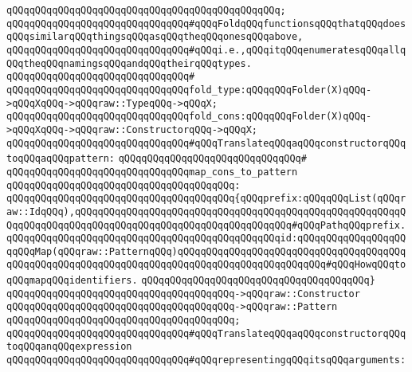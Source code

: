 \verb|qQQqqQQqqQQqqQQqqQQqqQQqqQQqqQQqqQQqqQQqqQQqqQQq;|\newline
\newline
\verb|qQQqqQQqqQQqqQQqqQQqqQQqqQQqqQQq#qQQqFoldqQQqfunctionsqQQqthatqQQqdoesqQQqsimilarqQQqthingsqQQqasqQQqtheqQQqonesqQQqabove,|\newline
\verb|qQQqqQQqqQQqqQQqqQQqqQQqqQQqqQQq#qQQqi.e.,qQQqitqQQqenumeratesqQQqallqQQqtheqQQqnamingsqQQqandqQQqtheirqQQqtypes.|\newline
\verb|qQQqqQQqqQQqqQQqqQQqqQQqqQQqqQQq#|\newline
\verb|qQQqqQQqqQQqqQQqqQQqqQQqqQQqqQQqfold_type:qQQqqQQqFolder(X)qQQq->qQQqXqQQq->qQQqraw::TypeqQQq->qQQqX;|\newline
\verb|qQQqqQQqqQQqqQQqqQQqqQQqqQQqqQQqfold_cons:qQQqqQQqFolder(X)qQQq->qQQqXqQQq->qQQqraw::ConstructorqQQq->qQQqX;|\newline
\newline
\verb|qQQqqQQqqQQqqQQqqQQqqQQqqQQqqQQq#qQQqTranslateqQQqaqQQqconstructorqQQqtoqQQqaqQQqpattern:|\newline
\verb|qQQqqQQqqQQqqQQqqQQqqQQqqQQqqQQq#|\newline
\verb|qQQqqQQqqQQqqQQqqQQqqQQqqQQqqQQqmap_cons_to_pattern|\newline
\verb|qQQqqQQqqQQqqQQqqQQqqQQqqQQqqQQqqQQqqQQq:|\newline
\verb|qQQqqQQqqQQqqQQqqQQqqQQqqQQqqQQqqQQqqQQq{qQQqprefix:qQQqqQQqList(qQQqraw::IdqQQq),qQQqqQQqqQQqqQQqqQQqqQQqqQQqqQQqqQQqqQQqqQQqqQQqqQQqqQQqqQQqqQQqqQQqqQQqqQQqqQQqqQQqqQQqqQQqqQQqqQQqqQQqqQQq#qQQqPathqQQqprefix.|\newline
\verb|qQQqqQQqqQQqqQQqqQQqqQQqqQQqqQQqqQQqqQQqqQQqqQQqid:qQQqqQQqqQQqqQQqqQQqqQQqMap(qQQqraw::PatternqQQq)qQQqqQQqqQQqqQQqqQQqqQQqqQQqqQQqqQQqqQQqqQQqqQQqqQQqqQQqqQQqqQQqqQQqqQQqqQQqqQQqqQQqqQQqqQQqqQQq#qQQqHowqQQqtoqQQqmapqQQqidentifiers.|\newline
\verb|qQQqqQQqqQQqqQQqqQQqqQQqqQQqqQQqqQQqqQQq}|\newline
\verb|qQQqqQQqqQQqqQQqqQQqqQQqqQQqqQQqqQQqqQQq->qQQqraw::Constructor|\newline
\verb|qQQqqQQqqQQqqQQqqQQqqQQqqQQqqQQqqQQqqQQq->qQQqraw::Pattern|\newline
\verb|qQQqqQQqqQQqqQQqqQQqqQQqqQQqqQQqqQQqqQQq;|\newline
\newline
\verb|qQQqqQQqqQQqqQQqqQQqqQQqqQQqqQQq#qQQqTranslateqQQqaqQQqconstructorqQQqtoqQQqanqQQqexpression|\newline
\verb|qQQqqQQqqQQqqQQqqQQqqQQqqQQqqQQq#qQQqrepresentingqQQqitsqQQqarguments:|\newline
